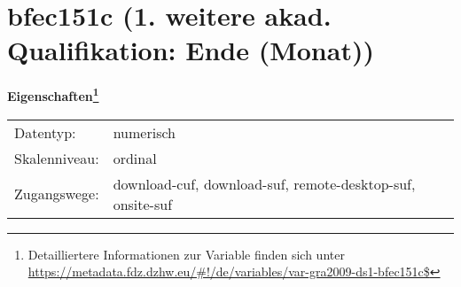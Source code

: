 
    \setcounter{footnote}{0}

    \vspace*{-1.8cm}
	\section{bfec151c (1. weitere akad. Qualifikation: Ende (Monat))}
	\label{section:bfec151c}



    \vspace*{0.5cm}
    \noindent\textbf{Eigenschaften\footnote{Detailliertere Informationen zur Variable finden sich unter
		\url{https://metadata.fdz.dzhw.eu/\#!/de/variables/var-gra2009-ds1-bfec151c$}}}\\
	\begin{tabularx}{\hsize}{@{}lX}
	Datentyp: & numerisch \\
	Skalenniveau: & ordinal \\
	Zugangswege: &
	  download-cuf, 
	  download-suf, 
	  remote-desktop-suf, 
	  onsite-suf
 \\
    \end{tabularx}



